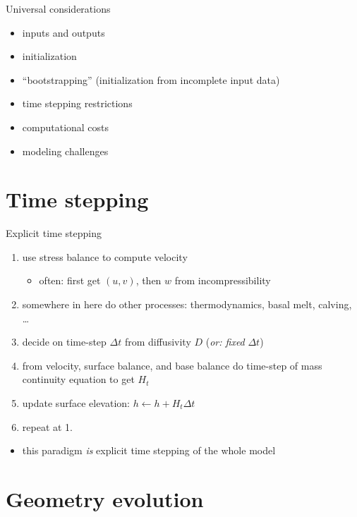 \documentclass[notes,intlimits]{beamer}
\begin{document}

\begin{frame}{Universal considerations}
  \begin{itemize}
  \item inputs and outputs
  \item initialization
  \item ``bootstrapping'' (initialization from incomplete input data)
  \item time stepping restrictions
  \item computational costs
  \item modeling challenges
  \end{itemize}
\end{frame}

\section{Time stepping}
\label{sec:time-stepping}

\begin{frame}{Explicit time stepping}

\begin{enumerate}
  \item use stress balance to compute velocity
      \begin{itemize}
      \item often: first get $(u,v)$, then $w$ from incompressibility
      \end{itemize}
  \item somewhere in here do other processes: thermodynamics, basal melt, calving, \dots
  \item decide on time-step $\Delta t$ from diffusivity $D$ \hfill (\emph{or: fixed} $\Delta t$)
  \item from velocity, surface balance, and base balance do time-step of mass continuity equation to get $H_t$
  \item update surface elevation: $h \gets h+H_t \Delta t$
  \item repeat at 1.
\end{enumerate}

\bigskip
\begin{itemize}
\item this paradigm \emph{is} explicit time stepping of the whole model
\end{itemize}
\end{frame}

\section{Geometry evolution}
\label{sec:geometry-evolution}
\end{document}
